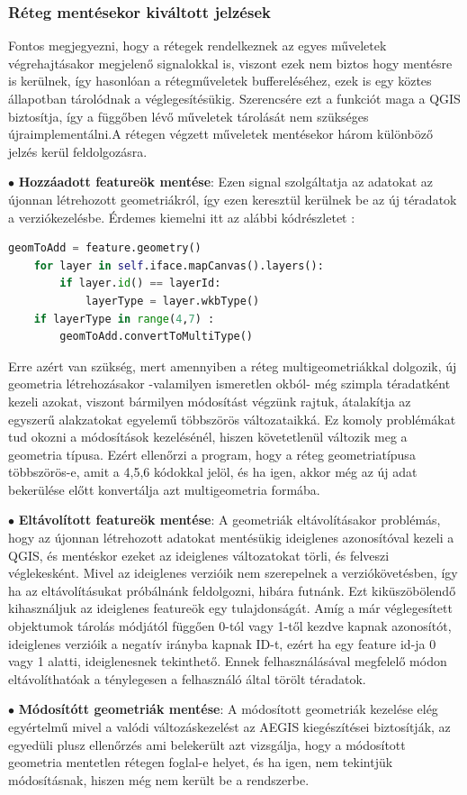 \subsubsection{Réteg mentésekor kiváltott jelzések}
Fontos megjegyezni, hogy a rétegek rendelkeznek az egyes műveletek végrehajtásakor megjelenő signalokkal is, viszont ezek nem biztos hogy mentésre is kerülnek, így hasonlóan a rétegműveletek buffereléséhez, ezek is egy köztes állapotban tárolódnak a véglegesítésükig. Szerencsére ezt a funkciót maga a QGIS biztosítja, így a függőben lévő műveletek tárolását nem szükséges újraimplementálni.A rétegen végzett műveletek mentésekor három különböző jelzés kerül feldolgozásra.
\begin{list}{}{}
	\item $\bullet$ \textbf{Hozzáadott featureök mentése}: Ezen signal szolgáltatja az adatokat az újonnan létrehozott geometriákról, így ezen keresztül kerülnek be az új téradatok a verziókezelésbe. Érdemes kiemelni itt az alábbi kódrészletet : 
	\begin{lstlisting}[language={python}]
	geomToAdd = feature.geometry()
	for layer in self.iface.mapCanvas().layers():
		if layer.id() == layerId:
			layerType = layer.wkbType()
	if layerType in range(4,7) :
		geomToAdd.convertToMultiType()
	\end{lstlisting}
	Erre azért van szükség, mert amennyiben a réteg multigeometriákkal dolgozik, új geometria létrehozásakor -valamilyen ismeretlen okból- még szimpla téradatként kezeli azokat, viszont bármilyen módosítást végzünk rajtuk, átalakítja az egyszerű alakzatokat egyelemű többszörös változataikká. Ez komoly problémákat tud okozni a módosítások kezelésénél, hiszen követetlenül változik meg a geometria típusa. Ezért ellenőrzi a program, hogy a réteg geometriatípusa többszörös-e, amit a 4,5,6 kódokkal jelöl, és ha igen, akkor még az új adat bekerülése előtt konvertálja azt multigeometria formába.
	\item $\bullet$ \textbf{Eltávolított featureök mentése}: A geometriák eltávolításakor problémás, hogy az újonnan létrehozott adatokat mentésükig ideiglenes azonosítóval kezeli a QGIS, és mentéskor ezeket az ideiglenes változatokat törli, és felveszi véglekesként. Mivel az ideiglenes verzióik nem szerepelnek a verziókövetésben, így ha az eltávolításukat próbálnánk feldolgozni, hibára futnánk. Ezt kiküszöbölendő kihasználjuk az ideiglenes featureök egy tulajdonságát. Amíg a már véglegesített objektumok tárolás módjától függően 0-tól vagy 1-től kezdve kapnak azonosítót, ideiglenes verzióik a negatív irányba kapnak ID-t, ezért ha egy feature id-ja 0 vagy 1 alatti, ideiglenesnek tekinthető. Ennek felhasználásával megfelelő módon eltávolíthatóak a ténylegesen a felhasználó által törölt téradatok.
	\item $\bullet$ \textbf{Módosítótt geometriák mentése}: A módosított geometriák kezelése elég egyértelmű mivel a valódi változáskezelést az AEGIS kiegészítései biztosítják, az egyedüli plusz ellenőrzés ami belekerült azt vizsgálja, hogy a módosított geometria mentetlen rétegen foglal-e helyet, és ha igen, nem tekintjük módosításnak, hiszen még nem került be a rendszerbe.
\end{list}
